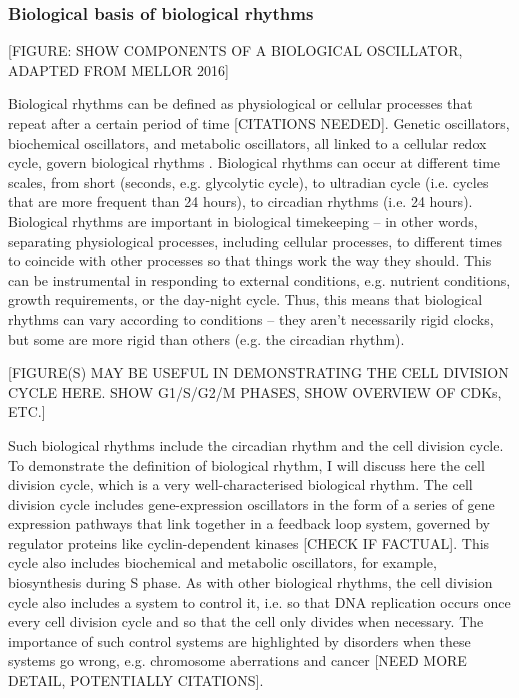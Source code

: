 \subsubsection{Biological basis of biological rhythms}
\label{subsubsec:intro-ymc-biological_rhythms-biological_basis}


[FIGURE: SHOW COMPONENTS OF A BIOLOGICAL OSCILLATOR, ADAPTED FROM MELLOR 2016]

Biological rhythms can be defined as physiological or cellular processes that repeat after a certain period of time [CITATIONS NEEDED].
Genetic oscillators, biochemical oscillators, and metabolic oscillators, all linked to a cellular redox cycle, govern biological rhythms \citep{mellorMolecularBasisMetabolic2016}.
Biological rhythms can occur at different time scales, from short (seconds, e.g. glycolytic cycle), to ultradian cycle (i.e. cycles that are more frequent than 24 hours), to circadian rhythms (i.e. 24 hours).
Biological rhythms are important in biological timekeeping -- in other words, separating physiological processes, including cellular processes, to different times to coincide with other processes so that things work the way they should.
This can be instrumental in responding to external conditions, e.g. nutrient conditions, growth requirements, or the day-night cycle.
Thus, this means that biological rhythms can vary according to conditions -- they aren't necessarily rigid clocks, but some are more rigid than others (e.g. the circadian rhythm).

[FIGURE(S) MAY BE USEFUL IN DEMONSTRATING THE CELL DIVISION CYCLE HERE.  SHOW G1/S/G2/M PHASES, SHOW OVERVIEW OF CDKs, ETC.]


Such biological rhythms include the circadian rhythm and the cell division cycle.
To demonstrate the definition of biological rhythm, I will discuss here the cell division cycle, which is a very well-characterised biological rhythm.
The cell division cycle includes gene-expression oscillators in the form of a series of gene expression pathways that link together in a feedback loop system, governed by regulator proteins like cyclin-dependent kinases [CHECK IF FACTUAL].
This cycle also includes biochemical and metabolic oscillators, for example, biosynthesis during S phase.
As with other biological rhythms, the cell division cycle also includes a system to control it, i.e. so that DNA replication occurs once every cell division cycle and so that the cell only divides when necessary.
The importance of such control systems are highlighted by disorders when these systems go wrong, e.g. chromosome aberrations and cancer [NEED MORE DETAIL, POTENTIALLY CITATIONS].

